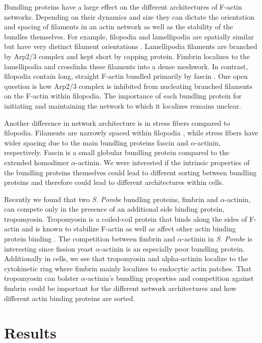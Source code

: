 Bundling proteins have a large effect on the different architectures of 
F-actin networks. Depending on their dynamics and size they can dictate 
the orientation and spacing of filaments in an actin network as well as 
the stability of the bundles themselves. For example, filopodia and lamellipodia are spatially similar but have very distinct filament orientations \citep{blanchoin_actin_2014}. Lamellipodia filaments are branched by Arp2/3 complex and kept short by capping protein. Fimbrin localizes to the lamellipodia and crosslinks these filaments into a dense meshwork. In contrast, filopodia contain long, straight F-actin bundled primarily by fascin \citep{vignjevic_role_2006}. One open question is how Arp2/3 complex is inhibited from nucleating branched filaments on the F-actin within filopodia. The importance of each bundling protein for initiating and maintaining the network to which it localizes remains unclear. 

Another difference in network architecture is in stress fibers compared to filopodia. Filaments are narrowly spaced within filopodia \citep{mattila_filopodia:_2008}, while stress 
fibers have wider spacing due to the main bundling proteins fascin and 
$\alpha$-actinin, respectively. Fascin is a small globular bundling protein compared to the extended homodimer $\alpha$-actinin. We were interested if the intrinsic properties of the bundling proteins themselves could lead to different sorting between bundling proteins and therefore could lead to different architectures within cells. 

Recently we found that two \textit{S. Pombe} bundling proteins, fimbrin and $\alpha$-actinin, can compete only in the presence of an additional side binding protein, tropomyosin. Tropomyosin is a coiled-coil protein that binds along the sides of F-actin and is known to stabilize F-actin as well as affect other actin binding protein binding \citep{perry_vertebrate_2001}. The competition between fimbrin and $\alpha$-actinin in \textit{S. Pombe} is interesting since fission yeast $\alpha$-actinin is an especially poor bundling protein. Additionally in cells, we see that tropomyosin and alpha-actinin localize to the cytokinetic ring where fimbrin mainly localizes to endocytic actin patches. That tropomyosin can bolster $\alpha$-actinin’s bundling properties and competition against fimbrin could be important for the different network architectures and how different actin binding proteins are sorted. 

\section{Results}\label{bundlers-results}


